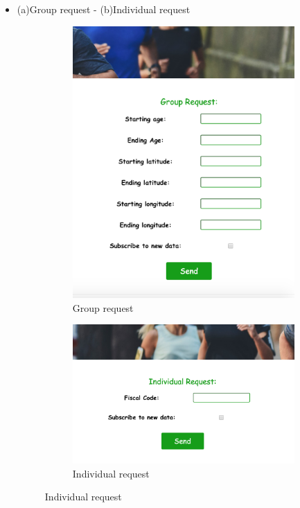 \documentclass{article}
\begin{document}
\begin{legal}
\begin{legal}
\begin{legal}
{\begin{itemize}
\begin{figure}[H]
\begin{subfigure}{.5\textwidth}
 						 \caption{Select the track of the run}
						\end{subfigure}
						\end{figure}
					\newpage
					\item (a)Group request  - (b)Individual request
						\begin{figure}[H]
						\centering
						\begin{subfigure}{.5\textwidth}
 						 \centering
 						 \includegraphics[width=0.5\linewidth]{../images/mockups/Group-request.png}
 						 \caption{Group request}
						\end{subfigure}%
						\begin{subfigure}{.5\textwidth}
  						\centering
  						\includegraphics[width=1\linewidth]{../images/mockups/Individual-request.png}
 						 \caption{Individual request}
						\end{subfigure}
						\end{figure}
				\end{itemize}	
}
\end{legal}
\end{legal}
\end{legal}
\end{document}
